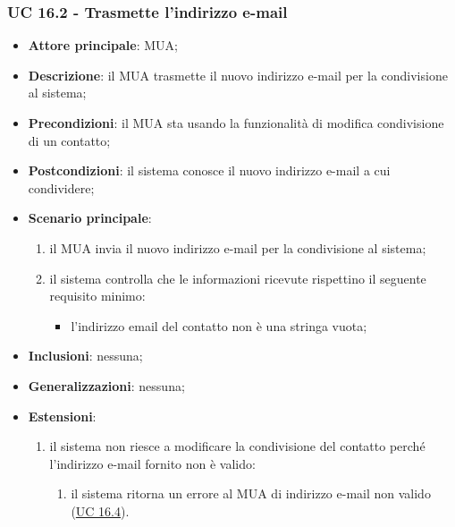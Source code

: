     \subsubsection{UC 16.2 - Trasmette l'indirizzo e-mail} \label{sec:UC16.2}
    \begin{itemize}
        \item \textbf{Attore principale}: MUA;
        \item \textbf{Descrizione}: il MUA trasmette il nuovo indirizzo e-mail per la condivisione al sistema;
        \item \textbf{Precondizioni}: il MUA sta usando la funzionalità di modifica condivisione di un contatto;
        \item \textbf{Postcondizioni}: il sistema conosce il nuovo indirizzo e-mail a cui condividere;
        \item \textbf{Scenario principale}:
            \begin{enumerate}
                \item il MUA invia il nuovo indirizzo e-mail per la condivisione al sistema;
                \item il sistema controlla che le informazioni ricevute rispettino il seguente requisito minimo:
                    \begin{itemize}
                        \item l'indirizzo email del contatto non è una stringa vuota;
                    \end{itemize}
            \end{enumerate}
        \item \textbf{Inclusioni}: nessuna;
        \item \textbf{Generalizzazioni}: nessuna;
        \item \textbf{Estensioni}:
            \begin{enumerate}[label=\alph*.]
                \item il sistema non riesce a modificare la condivisione del contatto perché l'indirizzo e-mail fornito non è valido:
                \begin{enumerate}[label=\arabic*.]
                    \item il sistema ritorna un errore al MUA di indirizzo e-mail non valido (\hyperref[sec:UC16.4]{UC 16.4}).
                \end{enumerate}
            \end{enumerate}
    \end{itemize}


